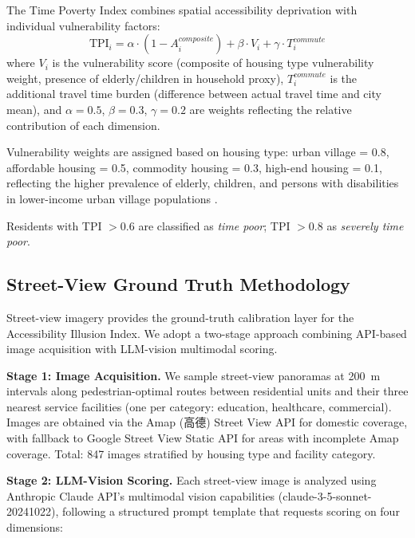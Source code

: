 \documentclass[preprint,12pt,authoryear]{elsarticle}
\begin{document}
The Time Poverty Index combines spatial accessibility deprivation with individual vulnerability factors:
\begin{equation}
\text{TPI}_i = \alpha \cdot (1 - A_i^{composite}) + \beta \cdot V_i + \gamma \cdot T_i^{commute}
\label{eq:tpi}
\end{equation}
where $V_i$ is the vulnerability score (composite of housing type vulnerability weight, presence of elderly/children in household proxy), $T_i^{commute}$ is the additional travel time burden (difference between actual travel time and city mean), and $\alpha = 0.5$, $\beta = 0.3$, $\gamma = 0.2$ are weights reflecting the relative contribution of each dimension.

Vulnerability weights are assigned based on housing type: urban village = 0.8, affordable housing = 0.5, commodity housing = 0.3, high-end housing = 0.1, reflecting the higher prevalence of elderly, children, and persons with disabilities in lower-income urban village populations \citep{wu2018urban}.

Residents with TPI $> 0.6$ are classified as \emph{time poor}; TPI $> 0.8$ as \emph{severely time poor}.

\subsection{Street-View Ground Truth Methodology}
\label{sec:streetview_method}

Street-view imagery provides the ground-truth calibration layer for the Accessibility Illusion Index. We adopt a two-stage approach combining API-based image acquisition with LLM-vision multimodal scoring.

\textbf{Stage 1: Image Acquisition.} We sample street-view panoramas at \SI{200}{\meter} intervals along pedestrian-optimal routes between residential units and their three nearest service facilities (one per category: education, healthcare, commercial). Images are obtained via the Amap (高德) Street View API for domestic coverage, with fallback to Google Street View Static API for areas with incomplete Amap coverage. Total: 847 images stratified by housing type and facility category.

\textbf{Stage 2: LLM-Vision Scoring.} Each street-view image is analyzed using Anthropic Claude API's multimodal vision capabilities (claude-3-5-sonnet-20241022), following a structured prompt template that requests scoring on four dimensions:
\end{document}
